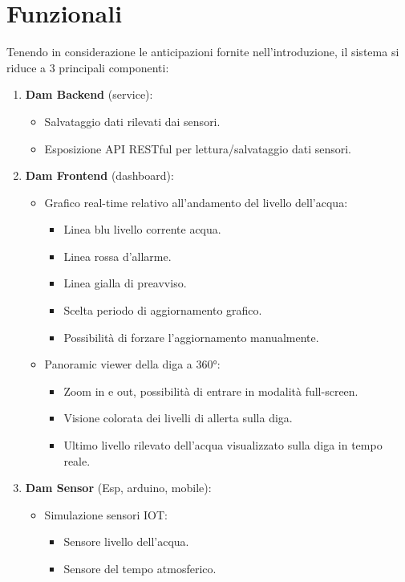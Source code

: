 \documentclass[a4paper,12pt]{report}
\begin{document}
\section{Funzionali}
Tenendo in considerazione le anticipazioni fornite nell'introduzione, il sistema si riduce a 3 principali componenti:
\begin{enumerate}
    \item \textbf{Dam Backend} (service):
    \begin{itemize}
        \item Salvataggio dati rilevati dai sensori.
        \item Esposizione API RESTful per lettura/salvataggio dati sensori.
    \end{itemize} 
    \item \textbf{Dam Frontend} (dashboard):
    \begin{itemize}
        \item Grafico real-time relativo all'andamento del livello dell'acqua:
        \begin{itemize}
            \item Linea blu livello corrente acqua.
            \item Linea rossa d'allarme.
            \item Linea gialla di preavviso.
            \item Scelta periodo di aggiornamento grafico.
            \item Possibilità di forzare l'aggiornamento manualmente.
        \end{itemize}
        \item Panoramic viewer della diga a 360°:
        \begin{itemize}
            \item Zoom in e out, possibilità di entrare in modalità full-screen.
            \item Visione colorata dei livelli di allerta sulla diga.
            \item Ultimo livello rilevato dell'acqua visualizzato sulla diga in tempo reale.
        \end{itemize}
    \end{itemize}
    \item \textbf{Dam Sensor} (Esp, arduino, mobile):
    \begin{itemize}
        \item Simulazione sensori IOT:
        \begin{itemize}
            \item Sensore livello dell'acqua.
            \item Sensore del tempo atmosferico.
        \end{itemize}
    \end{itemize}
\end{enumerate}
\end{document}
